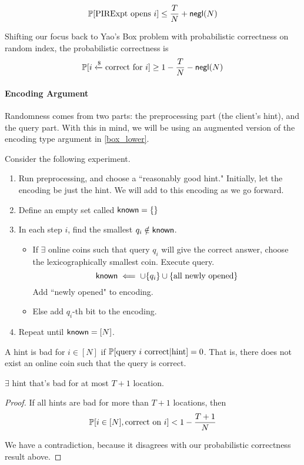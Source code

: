 \[\mathbb{P}[\text{PIRExpt opens $i$}] \le \frac{T}{N} + {\sf negl}(N)\]

\vspace{5mm}

Shifting our focus back to Yao's Box problem with probabilistic correctness on random index, the probabilistic correctness is
\[\mathbb{P}[i \xleftarrow{\$} \text{correct for $i$}] \ge 1 - \frac{T}{N} - {\sf negl}(N)\]

\paragraph{Encoding Argument}
Randomness comes from two parts: the preprocessing part (the client's hint), and the query part. With this in mind, we will be using an augmented version of the encoding type argument in \ref{box_lower}.

Consider the following experiment.
\begin{enumerate}
    \item Run preprocessing, and choose a ``reasonably good hint." Initially, let the encoding be just the hint. We will add to this encoding as we go forward.
    \item Define an empty set called ${\sf known} = \{\}$
    \item In each step $i$, find the smallest $q_i \notin {\sf known}$. 
    \begin{itemize}
        \item If $\exists$ online coins such that query $q_i$ will give the correct answer, choose the lexicographically smallest coin. Execute query.
        \[{\sf known} \impliedby \cup \{q_i\} \cup \{\text{all newly opened}\}\]
        Add ``newly opened" to encoding.
        \item Else add $q_i$-th bit to the encoding.
    \end{itemize}
    \item Repeat until ${\sf known} = [N]$.
    
\end{enumerate}

A hint is bad for $i \in [N]$ if $\mathbb{P}[\text{query $i$ correct} | \text{hint}] = 0$. That is, there does not exist an online coin such that the query is correct.

\begin{claim}
    $\exists$ hint that's bad for at most $T + 1$ location.
\end{claim}
\begin{proof}
    If all hints are bad for  more than $T+1$ locations, then
    \[\mathbb{P}[i \in [N], \text{correct on $i$}] < 1 - \frac{T+1}{N}\]

    We have a contradiction, because it disagrees with our probabilistic correctness result above.
\end{proof}

